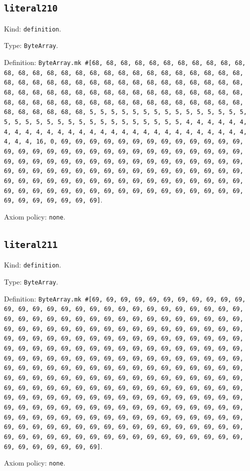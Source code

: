 \documentclass[11pt]{article}
\begin{document}
\subsection*{\texttt{literal210}}
\noindent Kind: \texttt{definition}.\par
\noindent Type: \texttt{ByteArray}.\par
\noindent Definition: \texttt{ByteArray.mk \#[68, 68, 68, 68, 68, 68, 68, 68, 68, 68, 68, 68, 68, 68, 68, 68, 68, 68, 68, 68, 68, 68, 68, 68, 68, 68, 68, 68, 68, 68, 68, 68, 68, 68, 68, 68, 68, 68, 68, 68, 68, 68, 68, 68, 68, 68, 68, 68, 68, 68, 68, 68, 68, 68, 68, 68, 68, 68, 68, 68, 68, 68, 68, 68, 68, 68, 68, 68, 68, 68, 68, 68, 68, 68, 68, 68, 68, 68, 68, 68, 68, 68, 68, 68, 68, 5, 5, 5, 5, 5, 5, 5, 5, 5, 5, 5, 5, 5, 5, 5, 5, 5, 5, 5, 5, 5, 5, 5, 5, 5, 5, 5, 5, 5, 5, 5, 5, 4, 4, 4, 4, 4, 4, 4, 4, 4, 4, 4, 4, 4, 4, 4, 4, 4, 4, 4, 4, 4, 4, 4, 4, 4, 4, 4, 4, 4, 4, 4, 4, 16, 0, 69, 69, 69, 69, 69, 69, 69, 69, 69, 69, 69, 69, 69, 69, 69, 69, 69, 69, 69, 69, 69, 69, 69, 69, 69, 69, 69, 69, 69, 69, 69, 69, 69, 69, 69, 69, 69, 69, 69, 69, 69, 69, 69, 69, 69, 69, 69, 69, 69, 69, 69, 69, 69, 69, 69, 69, 69, 69, 69, 69, 69, 69, 69, 69, 69, 69, 69, 69, 69, 69, 69, 69, 69, 69, 69, 69, 69, 69, 69, 69, 69, 69, 69, 69, 69, 69, 69, 69, 69, 69, 69, 69, 69, 69, 69, 69, 69, 69, 69, 69, 69, 69, 69, 69, 69]}.\par
\noindent Axiom policy: \texttt{none}.\par
\subsection*{\texttt{literal211}}
\noindent Kind: \texttt{definition}.\par
\noindent Type: \texttt{ByteArray}.\par
\noindent Definition: \texttt{ByteArray.mk \#[69, 69, 69, 69, 69, 69, 69, 69, 69, 69, 69, 69, 69, 69, 69, 69, 69, 69, 69, 69, 69, 69, 69, 69, 69, 69, 69, 69, 69, 69, 69, 69, 69, 69, 69, 69, 69, 69, 69, 69, 69, 69, 69, 69, 69, 69, 69, 69, 69, 69, 69, 69, 69, 69, 69, 69, 69, 69, 69, 69, 69, 69, 69, 69, 69, 69, 69, 69, 69, 69, 69, 69, 69, 69, 69, 69, 69, 69, 69, 69, 69, 69, 69, 69, 69, 69, 69, 69, 69, 69, 69, 69, 69, 69, 69, 69, 69, 69, 69, 69, 69, 69, 69, 69, 69, 69, 69, 69, 69, 69, 69, 69, 69, 69, 69, 69, 69, 69, 69, 69, 69, 69, 69, 69, 69, 69, 69, 69, 69, 69, 69, 69, 69, 69, 69, 69, 69, 69, 69, 69, 69, 69, 69, 69, 69, 69, 69, 69, 69, 69, 69, 69, 69, 69, 69, 69, 69, 69, 69, 69, 69, 69, 69, 69, 69, 69, 69, 69, 69, 69, 69, 69, 69, 69, 69, 69, 69, 69, 69, 69, 69, 69, 69, 69, 69, 69, 69, 69, 69, 69, 69, 69, 69, 69, 69, 69, 69, 69, 69, 69, 69, 69, 69, 69, 69, 69, 69, 69, 69, 69, 69, 69, 69, 69, 69, 69, 69, 69, 69, 69, 69, 69, 69, 69, 69, 69, 69, 69, 69, 69, 69, 69, 69, 69, 69, 69, 69, 69, 69, 69, 69, 69, 69, 69, 69, 69, 69, 69, 69, 69, 69, 69, 69, 69, 69, 69]}.\par
\noindent Axiom policy: \texttt{none}.\par
\end{document}
